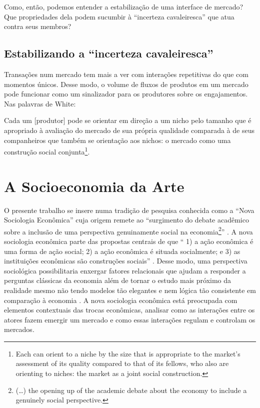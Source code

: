 \documentclass[a4paper, 12pt, openright, oneside, german, french, english, brazil]{abntex2}
\begin{document}
	Como, então, podemos entender a estabilização de uma interface de mercado? Que propriedades dela podem sucumbir à ``incerteza cavaleiresca'' que atua contra seus membros?
	
	\section{Estabilizando a ``incerteza cavaleiresca''}
	
	Transações num mercado tem mais a ver com interações repetitivas do que com momentos únicos. Desse modo, o volume de fluxos de produtos em um mercado pode funcionar como um sinalizador para os produtores sobre os engajamentos. Nas palavras de White:
	
	\begin{citacao}
		Cada um [produtor] pode se orientar em direção a um nicho pelo tamanho que é apropriado à avaliação do mercado de sua própria qualidade comparada à de seus companheiros que também se orientação aos nichos: o mercado como uma construção social conjunta\footnote{Each can orient to a niche by the size that is appropriate to the market's assessment of its quality compared to that of its fellows, who also are orienting to niches: the market as a joint social construction.}. \cite[p. 10]{white2002markets}
	\end{citacao}
	
	
	
	
	
	
	
	\chapter{A Socioeconomia da Arte}
	
	O presente trabalho se insere numa tradição de pesquisa conhecida como a ``Nova Sociologia Econômica'' cuja origem remete ao ``surgimento do debate acadêmico sobre a inclusão de uma perspectiva genuinamente social na economia\footnote{ (…) the opening up of the academic debate about the economy to include a genuinely social perspective.}'' \cite[p. 1]{swedberg1992introduction}. A nova sociologia econômica parte das propostas centrais de que `` 1) a ação econômica é uma forma de ação social; 2) a ação econômica é situada socialmente; e 3) as instituições econômicas são construções sociais'' \cite[p. 6]{swedberg1992introduction}. Desse modo, uma perspectiva sociológica possibilitaria enxergar fatores relacionais que ajudam a responder a perguntas clássicas da economia além de tornar o estudo mais próximo da realidade mesmo não tendo modelos tão elegantes e nem lógica tão consistente em comparação à economia \cite{hirsch1987dirty}. A nova sociologia econômica está preocupada com elementos contextuais das trocas econômicas, analisar como as interações entre os atores fazem emergir um mercado e como essas interações regulam e controlam os mercados. 
	
\end{document}
